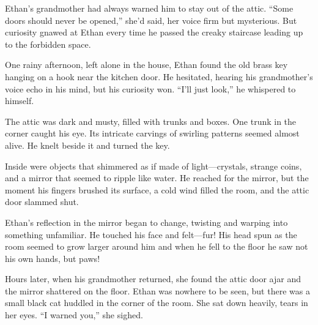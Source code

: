 \documentclass[12pt]{article}
\begin{document}
\begin{tcolorbox}[colframe=black!60, colback=white, 
coltitle=black, colbacktitle=black!15, fonttitle=\bfseries\Large, 
title=The Key in the Attic, halign title=center, left=10pt, right=10pt, top=10pt, bottom=15pt]



Ethan’s grandmother had always warned him to stay out of the attic. “Some doors should never be opened,” she’d said, her voice firm but mysterious. But curiosity gnawed at Ethan every time he passed the creaky staircase leading up to the forbidden space.  

One rainy afternoon, left alone in the house, Ethan found the old brass key hanging on a hook near the kitchen door. He hesitated, hearing his grandmother’s voice echo in his mind, but his curiosity won. “I’ll just look,” he whispered to himself.  

The attic was dark and musty, filled with trunks and boxes. One trunk in the corner caught his eye. Its intricate carvings of swirling patterns seemed almost alive. He knelt beside it and turned the key.  

Inside were objects that shimmered as if made of light—crystals, strange coins, and a mirror that seemed to ripple like water. He reached for the mirror, but the moment his fingers brushed its surface, a cold wind filled the room, and the attic door slammed shut.  

Ethan’s reflection in the mirror began to change, twisting and warping into something unfamiliar. He touched his face and felt—fur! His head spun as the room seemed to grow larger around him and when he fell to the floor he saw not his own hands, but paws!  

Hours later, when his grandmother returned, she found the attic door ajar and the mirror shattered on the floor. Ethan was nowhere to be seen, but there was a small black cat huddled in the corner of the room. She sat down heavily, tears in her eyes. “I warned you,” she sighed.  

 
 

 

\end{tcolorbox}
\end{document}
